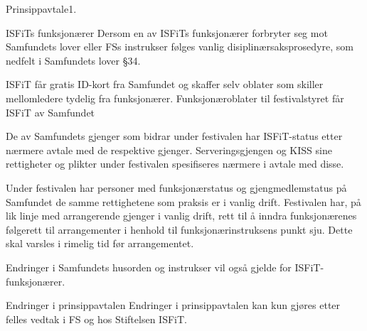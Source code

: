 \begin{instruks}{Prinsippavtale}{1. }{ }
\begin{instruksledd}{ISFiTs funksjonærer}
        Dersom en av ISFiTs funksjonærer forbryter seg mot Samfundets lover eller FSs instrukser følges
        vanlig
        disiplinærsaksprosedyre, som nedfelt i Samfundets lover §34.

        ISFiT får gratis ID-kort fra Samfundet og skaffer selv oblater som skiller mellomledere tydelig fra
        funksjonærer.
        Funksjonæroblater til festivalstyret får ISFiT av Samfundet

        De av Samfundets gjenger som bidrar under festivalen har ISFiT-status etter nærmere avtale med de
        respektive
        gjenger. Serveringsgjengen og KISS sine rettigheter og plikter under festivalen spesifiseres nærmere
        i avtale med
        disse.

        Under festivalen har personer med funksjonærstatus og gjengmedlemstatus på Samfundet de samme
        rettighetene som
        praksis er i vanlig drift. Festivalen har, på lik linje med arrangerende gjenger i vanlig drift,
        rett til å inndra
        funksjonærenes følgerett til arrangementer i henhold til funksjonærinstruksens punkt sju. Dette skal
        varsles i rimelig
        tid før arrangementet.

        Endringer i Samfundets husorden og instrukser vil også gjelde for ISFiT-funksjonærer.
    \end{instruksledd}


    \begin{instruksledd}{Endringer i prinsippavtalen}
        Endringer i prinsippavtalen kan kun gjøres etter felles vedtak i FS og hos Stiftelsen ISFiT.
    \end{instruksledd} 


\end{instruks}


